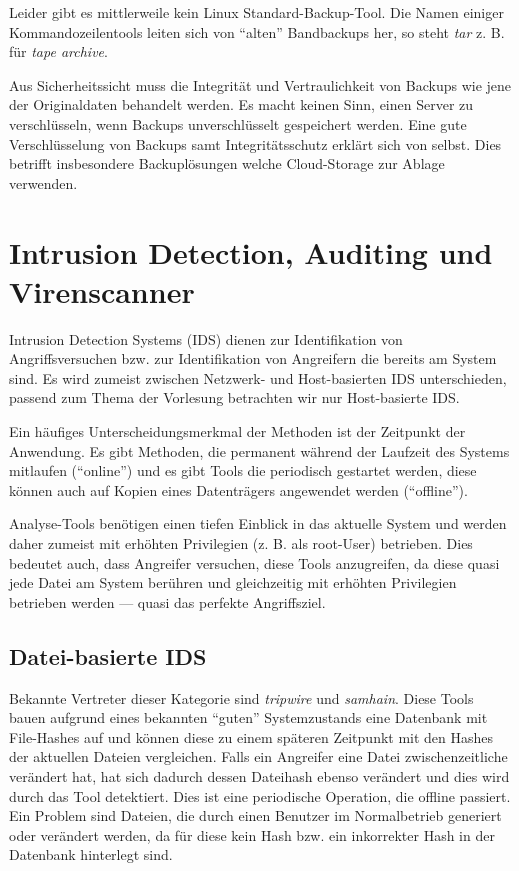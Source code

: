 Leider gibt es mittlerweile kein Linux Standard-Backup-Tool. Die Namen einiger Kommandozeilentools leiten sich von ``alten'' Bandbackups her, so steht \textit{tar} z. B. für \textit{tape archive}.

Aus Sicherheitssicht muss die Integrität und Vertraulichkeit von Backups wie jene der Originaldaten behandelt werden. Es macht keinen Sinn, einen Server zu verschlüsseln, wenn Backups unverschlüsselt gespeichert werden. Eine gute Verschlüsselung von Backups samt Integritätsschutz erklärt sich von selbst. Dies betrifft insbesondere Backuplösungen welche Cloud-Storage zur Ablage verwenden.

\chapter{Intrusion Detection, Auditing und Virenscanner}

Intrusion Detection Systems (IDS) dienen zur Identifikation von Angriffsversuchen bzw. zur Identifikation von Angreifern die bereits am System sind. Es wird zumeist zwischen Netzwerk- und Host-basierten IDS unterschieden, passend zum Thema der Vorlesung betrachten wir nur Host-basierte IDS.

Ein häufiges Unterscheidungsmerkmal der Methoden ist der Zeitpunkt der Anwendung. Es gibt Methoden, die permanent während der Laufzeit des Systems mitlaufen (``online'') und es gibt Tools die periodisch gestartet werden, diese können auch auf Kopien eines Datenträgers angewendet werden (``offline'').

Analyse-Tools benötigen einen tiefen Einblick in das aktuelle System und werden daher zumeist mit erhöhten Privilegien (z. B. als root-User) betrieben. Dies bedeutet auch, dass Angreifer versuchen, diese Tools anzugreifen, da diese quasi jede Datei am System berühren und gleichzeitig mit erhöhten Privilegien betrieben werden --- quasi das perfekte Angriffsziel.

\section{Datei-basierte IDS}

Bekannte Vertreter dieser Kategorie sind \textit{tripwire} und \textit{samhain}. Diese Tools bauen aufgrund eines bekannten ``guten'' Systemzustands eine Datenbank mit File-Hashes auf und können diese zu einem späteren Zeitpunkt mit den Hashes der aktuellen Dateien vergleichen. Falls ein Angreifer eine Datei zwischenzeitliche verändert hat, hat sich dadurch dessen Dateihash ebenso verändert und dies wird durch das Tool detektiert. Dies ist eine periodische Operation, die offline passiert. Ein Problem sind Dateien, die durch einen Benutzer im Normalbetrieb generiert oder verändert werden, da für diese kein Hash bzw. ein inkorrekter Hash in der Datenbank hinterlegt sind.

